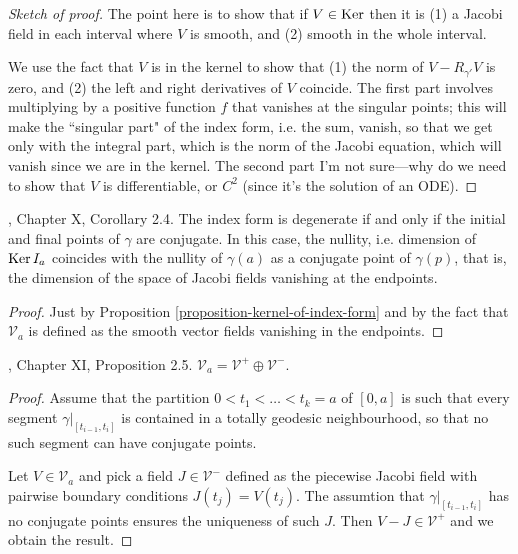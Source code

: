 \begin{proof}[Sketch of proof]
The point here is to show that if $V \in
\mathop{\mathrm{Ker}}$ then it is (1) a Jacobi
 field in each interval where $V$ is smooth,
 and (2) smooth in the whole
 interval.

We use the fact that $V$ is in the kernel to
show that (1) the norm of
$V-R_{\gamma'}V$ is zero, and (2) the left
and right derivatives of $V$
coincide. The first part involves multiplying
by a positive function $f$ that
vanishes at the singular points; this will
make the ``singular part" of the
index form, i.e. the sum, vanish, so that we
get only with the integral part,
which is the norm of the Jacobi equation,
which will vanish since we are in the
kernel. The second part I'm not sure---why do
we need to show that $V$ is
differentiable, or $C^2$ (since it's the
solution of an ODE).
\end{proof}

\begin{lemma}
\label{lemma-index-form-degen-iff-conju}
\cite{doc}, Chapter X, Corollary 2.4. The
index form is degenerate if and only
if the initial and final points of $\gamma$
are conjugate. In this case, the
nullity, i.e. dimension of $\mathop{\mathrm{Ker}} I_a$
coincides with the nullity of $\gamma(a)$
as a conjugate point of $\gamma(p)$, that is,
the dimension of the space of
Jacobi fields vanishing at the endpoints.
\end{lemma}

\begin{proof}
Just by Proposition
\ref{proposition-kernel-of-index-form} and by
the fact that
$\mathcal{V}_a$ is defined as the smooth
vector fields vanishing in the
endpoints.
\end{proof}

\begin{proposition}
\label{proposition-V-is-direct-sum}
\cite{doc}, Chapter XI, Proposition 2.5.
$\mathcal{V}_a=\mathcal{V}^+ \oplus
\mathcal{V}^-$.
\end{proposition}

\begin{proof}
Assume that the partition
$0<t_1<\ldots<t_k=a$ of $[0,a]$ is such that
every
segment $\gamma|_{[t_{i-1},t_i]}$ is
contained in a totally geodesic
neighbourhood, so that no such segment can
have conjugate points.

Let $V \in \mathcal{V}_a$ and pick a field $J
\in \mathcal{V}^-$ defined as the
piecewise Jacobi field with pairwise boundary
conditions $J(t_j)=V(t_j)$. The
assumtion that $\gamma|_{[t_{i-1},t_i]}$ has
no conjugate points ensures the
uniqueness of such $J$. Then
$V-J\in\mathcal{V}^+$ and we obtain the
result.
\end{proof}

